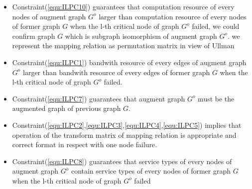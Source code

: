 \begin{itemize}
\item Constraint(\ref{equ:ILPC10}) guarantees that computation resource of every nodes of augment graph $G^o$ larger than computation resource of every nodes of former graph $G$ when the l-th critical node of graph $G^o$ failed, we could confirm graph $G$ which is subgraph isomorphism of augment graph $G^o$. we represent the mapping relation as permutation matrix in view of Ullman\cite{ullmann1976algorithm}

\item Constraint(\ref{equ:ILPC1}) bandwith resource of every edges of augment graph $G^o$ larger than bandwith resource of every edges of former graph $G$ when the l-th critical node of graph $G^o$ failed.

\item Constraint(\ref{equ:ILPC7}) guarantees that augment graph $G^o$ must be the augmented graph of previous graph $G$.
\item Constraint(\ref{equ:ILPC2},\ref{equ:ILPC3},\ref{equ:ILPC4},\ref{equ:ILPC5}) implies that operation of the transform matrix of mapping relation is appropriate and correct format in respect with one node failure.
\item Constraint(\ref{equ:ILPC8}) guarantees that  service types of every nodes of augment graph $G^o$ contain service types of every nodes of former graph $G$ when the l-th critical node of graph $G^o$ failed
\end{itemize}
%
%

